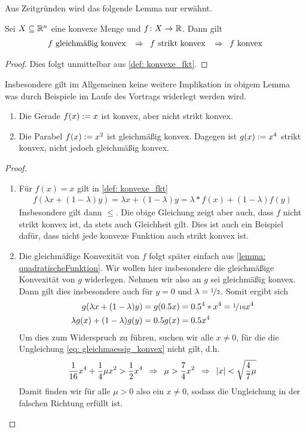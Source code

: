 Aus Zeitgründen wird das folgende Lemma nur erwähnt.
\begin{*lemma}
   	Sei $X \subseteq \mathbb{R}^n$ eine konvexe Menge und $\abb{f}{X}{\R}$. Dann gilt
   	\begin{align*}
   		f \text{ gleichmäßig konvex } \enskip \Rightarrow \enskip f \text{ strikt konvex } \enskip \Rightarrow \enskip f \text{ konvex}
   	\end{align*}
\end{*lemma}
\begin{proof}
	Dies folgt unmittelbar aus \cref{def: konvexe_fkt}.
\end{proof}

Insbesondere gilt im Allgemeinen keine weitere Implikation in obigem Lemma was durch Beispiele im Laufe des Vortrags widerlegt werden wird.

\begin{beispiel}
   	\begin{enumerate}[leftmargin=*, nolistsep, label=(\roman*)]
   		\item Die Gerade $f(x) \mathrel{:=} x$ ist konvex, aber nicht strikt konvex.
   		\item Die Parabel $f(x) \mathrel{:=} x^2$ ist gleichmäßig konvex. Dagegen ist $g(x) \mathrel{:=} x^4$ strikt konvex, nicht jedoch gleichmäßig konvex. 
   	\end{enumerate}
\end{beispiel}
\begin{proof}
	\begin{enumerate}[leftmargin=*, nolistsep, label=(\roman*)]
		\item Für $f(x) = x$ gilt in \eqref{def: konvexe_fkt}
		\begin{align*}
			f(\lambda x + (1-\lambda)y) = \lambda x + (1-\lambda) y = \lambda * f(x) + (1-\lambda) f(y)
		\end{align*}
		Insbesondere gilt dann $\leq$. Die obige Gleichung zeigt aber auch, dass $f$ nicht strikt konvex ist, da stets auch Gleichheit gilt. Dies ist auch ein Beispiel dafür, dass nicht jede konvexe Funktion auch strikt konvex ist. 
		\item Die gleichmäßige Konvexität von $f$ folgt später einfach aus \cref{lemma: quadratischeFunktion}. Wir wollen hier insbesondere die gleichmäßige Konvexität von $g$ widerlegen. Nehmen wir also an $g$ sei gleichmäßig konvex. Dann gilt dies insbesondere auch für $y=0$ und $\lambda = \lfrac{1}{2}$. Somit ergibt sich
		\begin{align*}
			g( \lambda x + (1-\lambda) y ) &= g(0.5 x) = 0.5^4 * x^4 = \lfrac{1}{16} x^4 \\
			\lambda g(x) + (1-\lambda) g(y) &= 0.5 g(x) = 0.5 x^4
		\end{align*}
		Um dies zum Widerspruch zu führen, suchen wir alle $x \neq 0$, für die die Ungleichung \eqref{eq: gleichmaessig_konvex} nicht gilt, d.h.
		\begin{align*}
			\frac{1}{16}x^4 + \frac{1}{4} \mu x^2 > \frac{1}{2} x^4 \enskip \Rightarrow \enskip \mu > \frac{7}{4}x^2 \enskip \Rightarrow \enskip \left| x \right| < \sqrt{\frac{4}{7} \mu}
		\end{align*}
		Damit finden wir für alle $\mu > 0$ also ein $x \neq 0$, sodass die Ungleichung in der falschen Richtung erfüllt ist.
	\end{enumerate}
\end{proof}

